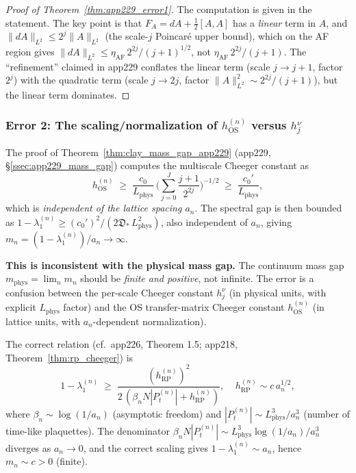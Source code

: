 \begin{proof}[Proof of Theorem~\ref{thm:app229_error1}]
The computation is given in the statement. The key point is that
$F_{A}=dA+\tfrac{1}{2}[A,A]$ has a \emph{linear} term in $A$,
and $\|dA\|_{L^{2}}\le 2^{j}\|A\|_{L^{2}}$ (the scale-$j$ Poincar\'e
upper bound), which on the AF region gives
$\|dA\|_{L^{2}}\le\eta_{\mathrm{AF}}\,2^{2j}/(j+1)^{1/2}$, not
$\eta_{\mathrm{AF}}\,2^{2j}/(j+1)$. The ``refinement'' claimed in
app229 conflates the linear term (scale $j\to j+1$, factor $2^{j}$)
with the quadratic term (scale $j\to 2j$, factor
$\|A\|_{L^{2}}^{2}\sim 2^{2j}/(j+1)$), but the linear term dominates.
\end{proof}

\subsubsection{Error 2: The scaling/normalization of
$h_{\mathrm{OS}}^{(n)}$ versus $h_{j}^{\nu}$}

\begin{theorem}
\label{thm:app229_error2}
The proof of Theorem~\ref{thm:clay_mass_gap_app229} (app229,
\S\ref{ssec:app229_mass_gap}) computes the multiscale Cheeger
constant as
\begin{equation}
\label{eq:app229_multiscale_claim}
  h_{\mathrm{OS}}^{(n)}
  \;\ge\;\frac{c_{0}}{L_{\mathrm{phys}}}\,
  \biggl(\sum_{j=0}^{J}\frac{j+1}{2^{2j}}\biggr)^{-1/2}
  \;\ge\;\frac{c_{0}'}{L_{\mathrm{phys}}},
\end{equation}
which is \emph{independent of the lattice spacing $a_{n}$}. The
spectral gap is then bounded as
$1-\lambda_{1}^{(n)}\ge(c_{0}')^{2}/(2\mathfrak{D}_{*}\,
L_{\mathrm{phys}}^{2})$, also independent of $a_{n}$, giving
$m_{n}=(1-\lambda_{1}^{(n)})/a_{n}\to\infty$.

\textbf{This is inconsistent with the physical mass gap.} The
continuum mass gap $m_{\mathrm{phys}}=\lim_{n}m_{n}$ should be
\emph{finite and positive}, not infinite. The error is a
confusion between the per-scale Cheeger constant $h_{j}^{\nu}$
(in physical units, with explicit $L_{\mathrm{phys}}$ factor)
and the OS transfer-matrix Cheeger constant $h_{\mathrm{OS}}^{(n)}$
(in lattice units, with $a_{n}$-dependent normalization).

The correct relation (cf.\ app226, Theorem 1.5;
app218, Theorem~\ref{thm:rp_cheeger}) is
\begin{equation}
\label{eq:correct_scaling}
  1-\lambda_{1}^{(n)}
  \;\ge\;\frac{(h_{\mathrm{RP}}^{(n)})^{2}}
       {2\,(\beta_{n}N|P_{t}^{(n)}|+h_{\mathrm{RP}}^{(n)})},
  \;\;\;\;
  h_{\mathrm{RP}}^{(n)}\sim c\,a_{n}^{1/2},
\end{equation}
where $\beta_{n}\sim\log(1/a_{n})$ (asymptotic freedom) and
$|P_{t}^{(n)}|\sim L_{\mathrm{phys}}^{3}/a_{n}^{3}$ (number of
time-like plaquettes). The denominator
$\beta_{n}N|P_{t}^{(n)}|\sim L_{\mathrm{phys}}^{3}\log(1/a_{n})/
a_{n}^{3}$ diverges as $a_{n}\to 0$, and the correct scaling gives
$1-\lambda_{1}^{(n)}\sim a_{n}$, hence
$m_{n}\sim c>0$ (finite).
\end{theorem}

